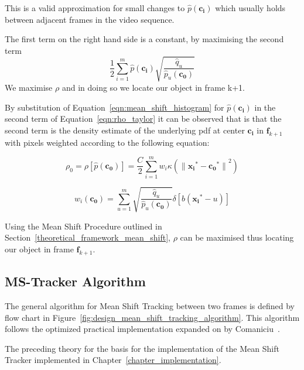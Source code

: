 This is a valid approximation for small changes to $\hat{p}(\mathbf{c_i})$
which usually holds between adjacent frames in the video sequence. 

The first term on the right hand side is a constant, by maximising the second
term 
\[\frac{1}{2}\sum_{i=1}^{m}\hat{p}(\mathbf{c_i})\sqrt{\frac{\hat{q}_u}{\hat{p}_u(\mathbf{c_0})}}\]
We maximise $\rho$ and in doing so we locate our object in frame k+1.

By substitution of Equation~\ref{eqn:mean_shift_histogram} for $\hat{p}(\mathbf{c_i})$ in
the second term of Equation~\ref{eqn:rho_taylor} it can be observed that is that the
second term is the density estimate of the underlying pdf at center
$\mathbf{c_i}$ in $\mathbf{f}_{k+1}$ with pixels weighted according to the
following equation:

\[\rho_0=\rho[\hat{p}(\mathbf{c_0})]=\frac{C}{2}\sum_{i=1}^{m}w_i\kappa({\parallel{\mathbf{x_i}^*}-{\mathbf{c_0}^*}\parallel}^2)\]

\begin{equation}\label{eqn:mean_shift_weights}
    w_i(\mathbf{c_0})=\sum_{u=1}^{m}\sqrt{\frac{\hat{q}_u}{\hat{p}_u(\mathbf{c_0})}}\delta[b(\mathbf{x_i}^*-u)]
\end{equation}

Using the Mean Shift Procedure outlined in Section~\ref{theoretical_framework_mean_shift}, $\rho$ can be maximised thus locating
our object in frame $\mathbf{f}_{k+1}$.

\subsection{MS-Tracker Algorithm}\label{theoretical_framework_mean_shift_algorithm}
The general algorithm for Mean Shift Tracking between two frames is defined by
flow chart in Figure~\ref{fig:design_mean_shift_tracking_algorithm}. This algorithm follows
the optimized practical implementation expanded on by Comaniciu~\cite{Comaniciu2003}. 


The preceding theory for the basis for the implementation of the Mean Shift
Tracker implemented in Chapter~\ref{chapter_implementation}.
